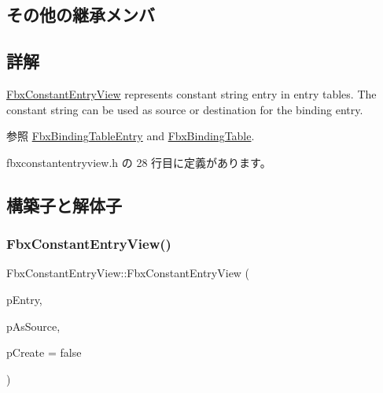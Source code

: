 \subsection*{その他の継承メンバ}


\subsection{詳解}
\hyperlink{class_fbx_constant_entry_view}{Fbx\+Constant\+Entry\+View} represents constant string entry in entry tables. The constant string can be used as source or destination for the binding entry. \begin{DoxySeeAlso}{参照}
\hyperlink{class_fbx_binding_table_entry}{Fbx\+Binding\+Table\+Entry} and \hyperlink{class_fbx_binding_table}{Fbx\+Binding\+Table}. 
\end{DoxySeeAlso}


 fbxconstantentryview.\+h の 28 行目に定義があります。



\subsection{構築子と解体子}
\mbox{\label{class_fbx_constant_entry_view_af49c9691fe825c0b62b3abe96c7ca823}} 
\subsubsection{\texorpdfstring{Fbx\+Constant\+Entry\+View()}{FbxConstantEntryView()}}
{\footnotesize\ttfamily Fbx\+Constant\+Entry\+View\+::\+Fbx\+Constant\+Entry\+View (\begin{DoxyParamCaption}\item[{\hyperlink{class_fbx_binding_table_entry}{Fbx\+Binding\+Table\+Entry} $\ast$}]{p\+Entry,  }\item[{bool}]{p\+As\+Source,  }\item[{bool}]{p\+Create = {\ttfamily false} }\end{DoxyParamCaption})}


